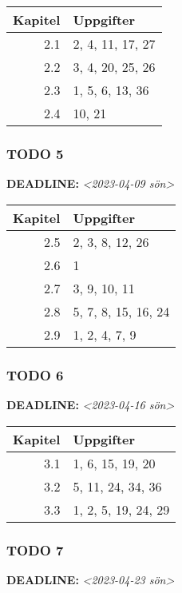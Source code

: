\documentclass[11pt]{article}
\begin{document}
\begin{center}
\begin{tabular}{rl}
Kapitel & Uppgifter\\[0pt]
\hline
2.1 & 2, 4, 11, 17, 27\\[0pt]
2.2 & 3, 4, 20, 25, 26\\[0pt]
2.3 & 1, 5, 6, 13, 36\\[0pt]
2.4 & 10, 21\\[0pt]
\end{tabular}
\end{center}


\subsubsection{{\bfseries\sffamily TODO} 5}
\label{sec:org6208e41}
\noindent\textbf{DEADLINE:} \textit{<2023-04-09 sön>}\\[0pt]

\begin{center}
\begin{tabular}{rl}
Kapitel & Uppgifter\\[0pt]
\hline
2.5 & 2, 3, 8, 12, 26\\[0pt]
2.6 & 1\\[0pt]
2.7 & 3, 9, 10, 11\\[0pt]
2.8 & 5, 7, 8, 15, 16, 24\\[0pt]
2.9 & 1, 2, 4, 7, 9\\[0pt]
\end{tabular}
\end{center}

\subsubsection{{\bfseries\sffamily TODO} 6}
\label{sec:org50e1739}
\noindent\textbf{DEADLINE:} \textit{<2023-04-16 sön>}\\[0pt]

\begin{center}
\begin{tabular}{rl}
Kapitel & Uppgifter\\[0pt]
\hline
3.1 & 1, 6, 15, 19, 20\\[0pt]
3.2 & 5, 11, 24, 34, 36\\[0pt]
3.3 & 1, 2, 5, 19, 24, 29\\[0pt]
\end{tabular}
\end{center}

\subsubsection{{\bfseries\sffamily TODO} 7}
\label{sec:orga55a61b}
\noindent\textbf{DEADLINE:} \textit{<2023-04-23 sön>}\\[0pt]
\end{document}
